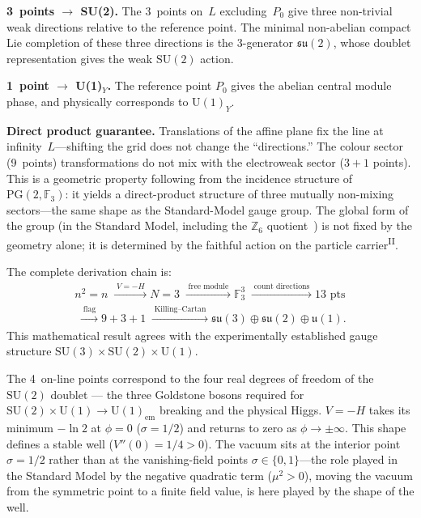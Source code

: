 \documentclass[12pt,a4paper]{article}
\newcommand{\PII}{\textsuperscript{\textup{II}}}
\begin{document}
\noindent\textbf{3~points $\to$ SU(2).}\;
The 3~points on~$L$ excluding~$P_0$ give three non-trivial
weak directions relative to the reference point.
The minimal non-abelian compact Lie completion of these three
directions is the 3-generator $\mathfrak{su}(2)$, whose doublet
representation gives the weak $\mathrm{SU}(2)$ action.

\noindent\textbf{1~point $\to$ U(1)$_Y$.}\;
The reference point $P_0$ gives the abelian central module phase, and physically corresponds to $\mathrm{U}(1)_Y$.

\noindent\textbf{Direct product guarantee.}\;
Translations of the affine plane fix the line at infinity~$L$---shifting the grid does not change the ``directions.''
The colour sector (9~points) transformations do not mix with the electroweak sector ($3{+}1$ points).
This is a geometric property following from the incidence structure of $\mathrm{PG}(2, \mathbb{F}_3)$: it yields a direct-product structure of three mutually non-mixing sectors---the same shape as the Standard-Model gauge group. The global form of the group (in the Standard Model, including the $\mathbb{Z}_6$ quotient~\cite{baezhuerta}) is not fixed by the geometry alone; it is determined by the faithful action on the particle carrier\PII{}.

The complete derivation chain is:
{\small
\begin{equation}
\begin{gathered}
n^2{=}n
\;\xrightarrow{\;V=-H\;}
N{=}3
\;\xrightarrow{\;\text{free module}\;}
\mathbb{F}_3^3
\;\xrightarrow{\;\text{count directions}\;}
13\text{ pts}\\
\;\xrightarrow{\;\text{flag}\;}
9{+}3{+}1
\;\xrightarrow{\;\text{Killing--Cartan}\;}
\mathfrak{su}(3){\oplus}\mathfrak{su}(2){\oplus}\mathfrak{u}(1).
\end{gathered}
\end{equation}
}
This mathematical result agrees with the experimentally
established gauge structure
$\mathrm{SU}(3) \times \mathrm{SU}(2) \times \mathrm{U}(1)$.

The 4~on-line points correspond to the four real degrees of freedom
of the $\mathrm{SU}(2)$ doublet --- the three Goldstone bosons
required for $\mathrm{SU}(2){\times}\mathrm{U}(1) \to
\mathrm{U}(1)_\mathrm{em}$ breaking and the physical Higgs.
$V = -H$ takes its minimum $-\ln 2$ at $\phi = 0$ ($\sigma = 1/2$)
and returns to zero as $\phi \to \pm\infty$.
This shape defines a stable well ($V''(0) = 1/4 > 0$). The vacuum sits at the interior point $\sigma = 1/2$ rather than at the vanishing-field points $\sigma \in \{0,1\}$---the role played in the Standard Model by the negative quadratic term ($\mu^2 > 0$), moving the vacuum from the symmetric point to a finite field value, is here played by the shape of the well.
\end{document}
